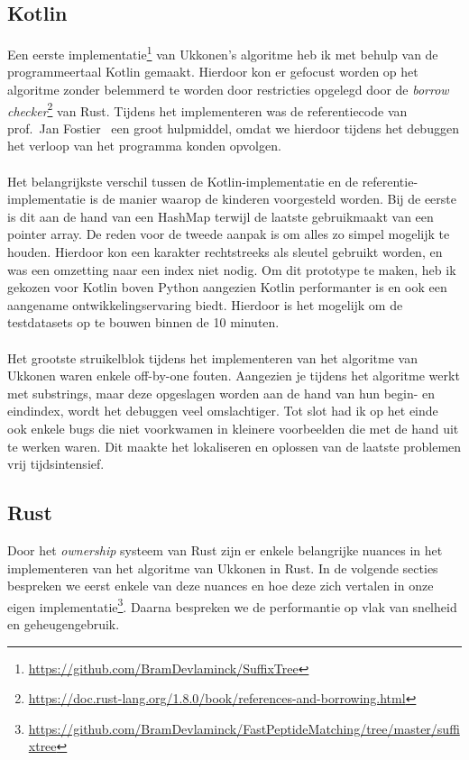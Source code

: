 \subsection{Kotlin}\label{subsec:kotlin}
Een eerste implementatie\footnote{\url{https://github.com/BramDevlaminck/SuffixTree}} van Ukkonen's algoritme heb ik met behulp van de programmeertaal Kotlin gemaakt.
Hierdoor kon er gefocust worden op het algoritme zonder belemmerd te worden door restricties opgelegd door de \textit{borrow checker}\footnote{\url{https://doc.rust-lang.org/1.8.0/book/references-and-borrowing.html}} van Rust.
Tijdens het implementeren was de referentiecode van prof.~Jan Fostier~\cite{Ukkonen_CCB} een groot hulpmiddel, omdat we hierdoor tijdens het debuggen het verloop van het programma konden opvolgen.
\\ \\
Het belangrijkste verschil tussen de Kotlin-implementatie en de referentie-implementatie is de manier waarop de kinderen voorgesteld worden.
Bij de eerste is dit aan de hand van een HashMap terwijl de laatste gebruikmaakt van een pointer array.
De reden voor de tweede aanpak is om alles zo simpel mogelijk te houden.
Hierdoor kon een karakter rechtstreeks als sleutel gebruikt worden, en was een omzetting naar een index niet nodig.
Om dit prototype te maken, heb ik gekozen voor Kotlin boven Python aangezien Kotlin performanter is en ook een aangename ontwikkelingservaring biedt.
Hierdoor is het mogelijk om de testdatasets op te bouwen binnen de 10 minuten.
\\ \\
Het grootste struikelblok tijdens het implementeren van het algoritme van Ukkonen waren enkele off-by-one fouten.
Aangezien je tijdens het algoritme werkt met substrings, maar deze opgeslagen worden aan de hand van hun begin- en eindindex, wordt het debuggen veel omslachtiger.
Tot slot had ik op het einde ook enkele bugs die niet voorkwamen in kleinere voorbeelden die met de hand uit te werken waren.
Dit maakte het lokaliseren en oplossen van de laatste problemen vrij tijdsintensief.

\subsection{Rust}\label{subsec:rust}
Door het \textit{ownership} systeem van Rust zijn er enkele belangrijke nuances in het implementeren van het algoritme van Ukkonen in Rust.
In de volgende secties bespreken we eerst enkele van deze nuances en hoe deze zich vertalen in onze eigen implementatie\footnote{\url{https://github.com/BramDevlaminck/FastPeptideMatching/tree/master/suffixtree}}.
Daarna bespreken we de performantie op vlak van snelheid en geheugengebruik.

